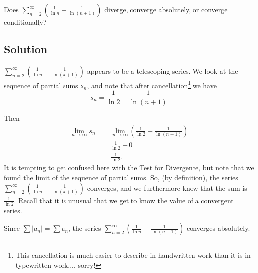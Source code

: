 \documentclass{article}
\begin{document}
\noindent
Does $\displaystyle \sum_{n=2}^\infty \left( \frac{1}{\ln n} - \frac{1}{\ln(n+1)} \right)$
diverge, converge absolutely, or converge conditionally?


\subsection*{Solution}

$\displaystyle \sum_{n=2}^\infty \left( \frac{1}{\ln n} - \frac{1}{\ln(n+1)} \right)$ appears to be a telescoping series. We look at the sequence of partial sums $s_n$, and note that after cancellation\footnote{This cancellation is much easier to describe in handwritten work than it is in typewritten work.... sorry!} we have
\[ s_n = \frac{1}{\ln 2} - \frac{1}{\ln(n+1)}\]

Then
\begin{align*}
\lim_{n \to \infty} s_n
&= \lim_{n \to \infty} \left(\frac{1}{\ln 2} - \frac{1}{\ln(n+1)}\right)\\
&= \frac{1}{\ln 2} - 0\\
&= \frac{1}{\ln 2}.
\end{align*}
{\color{red} It is tempting to get confused here with the Test for Divergence, but note that we found the limit of the sequence of partial sums.} So, (by definition), the series  $\displaystyle \sum_{n=2}^\infty \left( \frac{1}{\ln n} - \frac{1}{\ln(n+1)}\right)$ converges, and we furthermore know that the sum is $\frac{1}{\ln 2}$. Recall that it is unusual that we get to know the value of a convergent series.

Since $\sum |a_n| = \sum a_n$, the series $\displaystyle \sum_{n=2}^\infty \left( \frac{1}{\ln n} - \frac{1}{\ln(n+1)} \right)$ converges absolutely.
\end{document}
